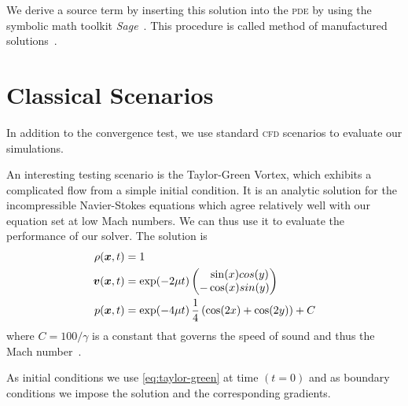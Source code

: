 We derive a source term by inserting this solution into the \textsc{pde} by using the symbolic math toolkit \textit{Sage}~\cite{sagemath}.
This procedure is called method of manufactured solutions~\cite{salari2000code}.

\section{Classical Scenarios}
In addition to the convergence test, we use standard \textsc{cfd} scenarios to evaluate our simulations.


An interesting testing scenario is the Taylor-Green Vortex, which exhibits a complicated flow from a simple initial condition.
It is an analytic solution for the incompressible Navier-Stokes equations which agree relatively well with our equation set at low Mach numbers.
We can thus use it to evaluate the performance of our solver.
The solution is
\begin{align}
  \label{eq:taylor-green}
  \begin{split}
  \rho(\bm{x}, t) &= 1\\
  \bm{v}(\bm{x}, t) &= \exp(-2 \mu t)
  \begin{pmatrix}
    \phantom{-}\sin(x) cos(y) \\
- \cos(x) sin(y) 
    \end{pmatrix} \\
  p(\bm{x}, t) &= \exp(-4 \mu t) \, \frac{1}{4} \left( \cos(2x) + \cos(2y) \right) + C
  \end{split}
\end{align}
where $C = 100/\gamma$ is a constant that governs the speed of sound and thus the Mach number~\cite{dumbser2016high}.

As initial conditions we use \cref{eq:taylor-green} at time $(t = 0)$ and as boundary conditions we impose the solution and the corresponding gradients.

